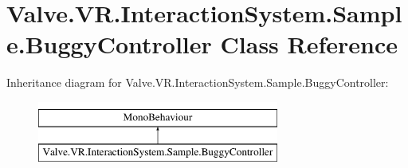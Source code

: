 \hypertarget{class_valve_1_1_v_r_1_1_interaction_system_1_1_sample_1_1_buggy_controller}{}\section{Valve.\+V\+R.\+Interaction\+System.\+Sample.\+Buggy\+Controller Class Reference}
\label{class_valve_1_1_v_r_1_1_interaction_system_1_1_sample_1_1_buggy_controller}
Inheritance diagram for Valve.\+V\+R.\+Interaction\+System.\+Sample.\+Buggy\+Controller\+:\begin{figure}[H]
\begin{center}
\leavevmode
\includegraphics[height=2.000000cm]{class_valve_1_1_v_r_1_1_interaction_system_1_1_sample_1_1_buggy_controller}
\end{center}
\end{figure}
